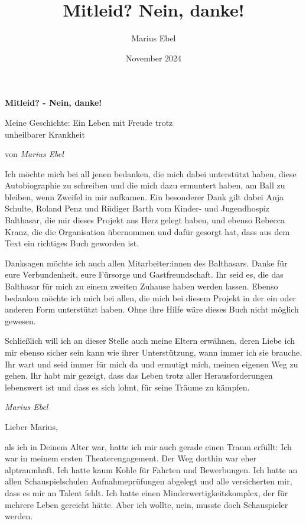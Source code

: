 \documentclass[fontsize=14pt,a4paper,headinclude,DIV=calc,automark]{scrbook}
\title{Mitleid? Nein, danke!}
\author{Marius Ebel}
\date{November 2024}
\begin{document}
\frontmatter



\thispagestyle{empty}
\vspace*{\fill}
\begin{center}
    \huge\bfseries Mitleid? - Nein, danke!\par
    \vspace{1cm}
    \large Meine Geschichte: Ein Leben mit Freude trotz\\ unheilbarer Krankheit\par
    \vspace{1cm}
    \normalsize von \textit{Marius Ebel}\par
\end{center}
\vspace*{\fill}

\pagestyle{plain}

Ich möchte mich bei all jenen bedanken, die mich dabei unterstützt haben, diese Autobiographie zu schreiben und die mich dazu ermuntert haben, am Ball zu bleiben, wenn Zweifel in mir aufkamen.
Ein besonderer Dank gilt dabei Anja Schulte, Roland Penz und Rüdiger Barth vom Kinder- und Jugendhospiz Balthasar, die mir dieses Projekt ans Herz gelegt haben, und ebenso Rebecca Kranz, die die Organisation übernommen und dafür gesorgt hat, dass aus dem Text ein richtiges Buch geworden ist.

Danksagen möchte ich auch allen Mitarbeiter:innen des Balthasars. Danke für eure Verbundenheit, eure Fürsorge und Gastfreundschaft. Ihr seid es, die das Balthasar für mich zu einem zweiten Zuhause haben werden lassen.
Ebenso bedanken möchte ich mich bei allen, die mich bei diesem Projekt in der ein oder anderen Form unterstützt haben. Ohne ihre Hilfe wäre dieses Buch nicht möglich gewesen.

Schließlich will ich an dieser Stelle auch meine Eltern erwähnen, deren Liebe ich mir ebenso sicher sein kann wie ihrer Unterstützung, wann immer ich sie brauche. Ihr wart und seid immer für mich da und ermutigt mich, meinen eigenen Weg zu gehen. Ihr habt mir gezeigt, dass das Leben trotz aller Herausforderungen lebenswert ist und dass es sich lohnt, für seine Träume zu kämpfen.

\vspace{0.5cm}
\noindent\textit{Marius Ebel}

Lieber Marius,\par
\vspace*{0.5\baselineskip}
\noindent als ich in Deinem Alter war, hatte ich mir auch gerade einen Traum erfüllt: Ich war in meinem ersten Theaterengagement.
Der Weg dorthin war eher alptraumhaft. Ich hatte kaum Kohle für Fahrten und Bewerbungen. Ich hatte an allen Schauspielschulen Aufnahmeprüfungen abgelegt und alle versicherten mir, dass es mir an Talent fehlt. Ich hatte einen Minderwertigkeitskomplex, der für mehrere Leben gereicht hätte.
Aber ich wollte, nein, musste doch Schauspieler werden.
\end{document}
